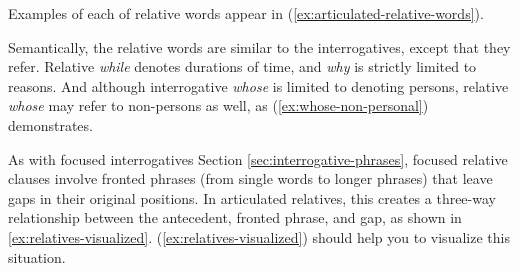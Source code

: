 Examples of each of relative words appear in (\ref{ex:articulated-relative-words}).

\ea \label{ex:articulated-relative-words}
    \z
\z

Semantically, the relative words are similar to the interrogatives, except that they refer. Relative \textit{while} denotes durations of time, and \textit{why} is strictly limited to reasons. And although interrogative \textit{whose} is limited to denoting persons, relative \textit{whose} may refer to non-persons as well, as (\ref{ex:whose-non-personal}) demonstrates.

\begin{samepage}
    \ea\label{ex:whose-non-personal}
        \z
    \z
\end{samepage}



As with focused interrogatives Section \ref{sec:interrogative-phrases}, focused relative clauses involve fronted phrases (from single words to longer phrases) that leave gaps in their original positions. In articulated relatives, this creates a three-way relationship between the antecedent, fronted phrase, and gap, as shown in \ref{ex:relatives-visualized}.  (\ref{ex:relatives-visualized}) should help you to visualize this situation.

